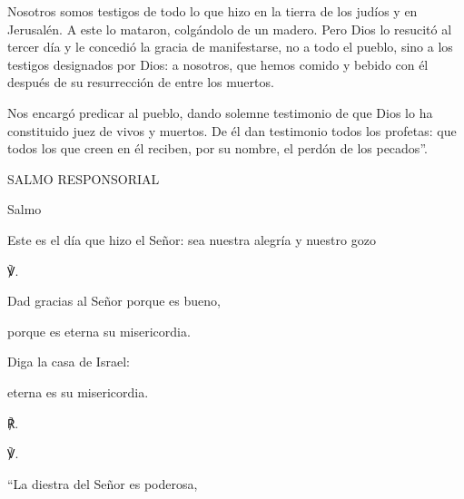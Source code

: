 			\begin{readtalk}Nosotros somos testigos de todo lo que hizo en la tierra de los judíos y en Jerusalén. A este lo mataron, colgándolo de un madero. Pero Dios lo resucitó al tercer día y le concedió la gracia de manifestarse, no a todo el pueblo, sino a los testigos designados por Dios: a nosotros, que hemos comido y bebido con él después de su resurrección de entre los muertos. \end{readtalk}
			
			\begin{readtalk}Nos encargó predicar al pueblo, dando solemne testimonio de que Dios lo ha constituido juez de vivos y muertos. De él dan testimonio todos los profetas: que todos los que creen en él reciben, por su nombre, el perdón de los pecados”.\end{readtalk}
			
			\begin{readtitle}SALMO RESPONSORIAL\end{readtitle}
			
			\begin{readbook}Salmo \end{readbook}
			
			\begin{readtheme}Este es el día que hizo el Señor: sea nuestra alegría y nuestro gozo\end{readtheme}
			
			\begin{readbody}\begin{readred}℣.\end{readred} Dad gracias al Señor porque es bueno, \end{readbody}
			
			\begin{readtabbed}porque es eterna su misericordia. \end{readtabbed}
			
			\begin{readtabbed}Diga la casa de Israel: \end{readtabbed}
			
			\begin{readtabbed}eterna es su misericordia. \begin{readred}℟.\end{readred}\end{readtabbed}
			
			\begin{readbody}\begin{readred}℣.\end{readred} “La diestra del Señor es poderosa, \end{readbody}
			
